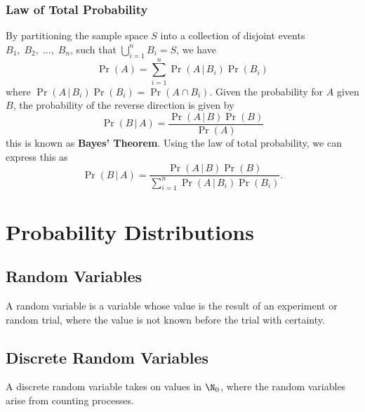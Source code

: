 \documentclass{article}
\begin{document}
\subsubsection{Law of Total Probability}
By partitioning the sample space \(S\) into a collection of disjoint
events \(B_1,\; B_2,\; \dots,\; B_n\), such that \(\bigcup_{i = 1}^n
B_i = S\), we have
\begin{equation*}
    \Pr{\left( A \right)} = \sum_{i = 1}^n \Pr{\left( A \,\vert\, B_i \right)}\Pr{\left( B_i \right)}
\end{equation*}
where \(\Pr{\left( A \,\vert\, B_i \right)} \Pr{\left( B_i \right)} = \Pr{\left( A \cap B_i \right)}\).
Given the probability for \(A\) given \(B\), the probability of the
reverse direction is given by
\begin{equation*}
    \Pr{\left( B \,\vert\, A \right)} = \frac{\Pr{\left( A \,\vert\, B \right)}\Pr{\left( B \right)}}{\Pr{\left( A \right)}}
\end{equation*}
this is known as \textbf{Bayes' Theorem}. Using the law of total
probability, we can express this as
\begin{equation*}
    \Pr{\left( B \,\vert\, A \right)} = \frac{\Pr{\left( A \,\vert\, B \right)}\Pr{\left( B \right)}}{\sum_{i = 1}^n \Pr{\left( A \,\vert\, B_i \right)}\Pr{\left( B_i \right)}}.
\end{equation*}
\section{Probability Distributions}
\subsection{Random Variables}
A random variable is a variable whose value is the result of an
experiment or random trial, where the value is not known before the
trial with certainty.
\subsection{Discrete Random Variables}
\begin{definition}
    A discrete random variable takes on values in \(\N_0\), where the
    random variables arise from counting processes.
\end{definition}
\end{document}

